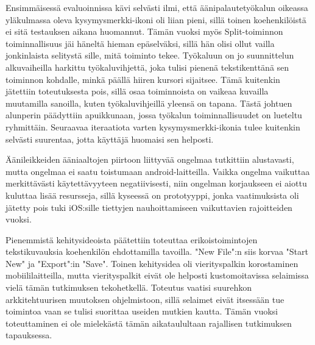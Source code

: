 \documentclass[utf8]{gradu3}
\begin{document}
Ensimmäisessä evaluoinnissa kävi selvästi ilmi, että äänipalautetyökalun oikeassa yläkulmassa oleva kysymysmerkki-ikoni oli liian pieni, sillä toinen koehenkilöistä ei sitä testauksen aikana huomannut. Tämän vuoksi myös Split-toiminnon toiminnallisuus jäi häneltä hieman epäselväksi, sillä hän olisi ollut vailla jonkinlaista selitystä sille, mitä toiminto tekee. Työkaluun on jo suunnittelun alkuvaiheilla harkittu työkaluvihjettä, joka tulisi pienenä tekstikenttänä sen toiminnon kohdalle, minkä päällä hiiren kursori sijaitsee. Tämä kuitenkin jätettiin toteutuksesta pois, sillä osaa toiminnoista on vaikeaa kuvailla muutamilla sanoilla, kuten työkaluvihjeillä yleensä on tapana. Tästä johtuen alunperin päädyttiin apuikkunaan, jossa työkalun toiminnallisuudet on lueteltu ryhmittäin. Seuraavaa iteraatiota varten kysymysmerkki-ikonia tulee kuitenkin selvästi suurentaa, jotta käyttäjä huomaisi sen helposti.

Äänileikkeiden ääniaaltojen piirtoon liittyvää ongelmaa tutkittiin alustavasti, mutta ongelmaa ei saatu toistumaan android-laitteilla. Vaikka ongelma vaikuttaa merkittävästi käytettävyyteen negatiivisesti, niin ongelman korjaukseen ei aiottu kuluttaa lisää resursseja, sillä kyseessä on prototyyppi, jonka vaatimuksista oli jätetty pois tuki iOS:sille tiettyjen nauhoittamiseen vaikuttavien rajoitteiden vuoksi. 

Pienemmistä kehitysideoista päätettiin toteuttaa erikoistoimintojen tekstikuvauksia koehenkilön ehdottamilla tavoilla. "New File":n siis korvaa "Start New" ja "Export":in "Save". Toinen kehitysidea oli vierityspalkin korostaminen mobiililaitteilla, mutta vierityspalkit eivät ole helposti kustomoitavissa selaimissa vielä tämän tutkimuksen tekohetkellä. Toteutus vaatisi suurehkon arkkitehtuurisen muutoksen ohjelmistoon, sillä selaimet eivät itsessään tue toimintoa vaan se tulisi suorittaa useiden mutkien kautta. Tämän vuoksi toteuttaminen ei ole mielekästä tämän aikataulultaan rajallisen tutkimuksen tapauksessa.
\end{document}

